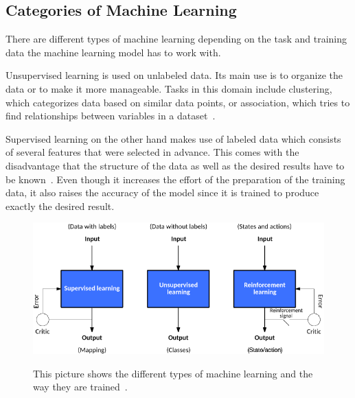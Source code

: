 
\subsection{Categories of Machine Learning}
There are different types of machine learning depending on the task and training data the machine learning model has to work with.

Unsupervised learning is used on unlabeled data. Its main use is to organize the data or to make it more manageable. Tasks in this domain include clustering, which categorizes data based on similar data points, or association, which tries to find relationships between variables in a dataset~\cite{supervised-unsupervised-learning}.

Supervised learning on the other hand makes use of labeled data which consists of several features that were selected in advance. This comes with the disadvantage that the structure of the data as well as the desired results have to be known~\cite{classical-ml}. Even though it increases the effort of the preparation of the training data, it also raises the accuracy of the model since it is trained to produce exactly the desired result.


\begin{figure}[ht]
  \caption[Different kinds of machine learning]{This picture shows the different types of machine learning and the way they are trained~\cite{types-of-ml}.} %
  \centering
  \includegraphics[width=\linewidth]{img/types_of_machine_learning.png}\label{fig:kinds_of_ml}
\end{figure}
